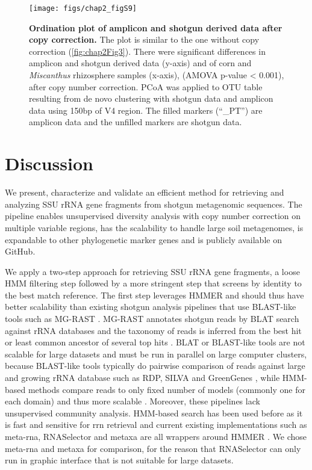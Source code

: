 \documentclass[]{msu-thesis}
\begin{document}
\begin{figure}[tbph!]
  \centering
  \texttt{[image: figs/chap2\_figS9]}
  \caption[Ordination plot of amplicon and shotgun derived data after copy correction]{\textbf{Ordination plot of amplicon and shotgun derived data after copy correction.} The plot is similar to the one without copy correction (\cref{fig:chap2Fig3}). There were significant differences in amplicon and shotgun derived data (y-axis) and of corn and \textit{Miscanthus} rhizosphere samples (x-axis), (AMOVA p-value < 0.001), after copy number correction. PCoA was applied to OTU table resulting from de novo clustering with shotgun data and amplicon data using 150bp of V4 region. The filled markers (``\_PT'') are amplicon data and the unfilled markers are shotgun data.}
  \label{fig:chap2FigS9}
\end{figure}


\section{Discussion}

We present, characterize and validate an efficient method for retrieving and analyzing SSU rRNA gene fragments from shotgun metagenomic sequences. The pipeline enables unsupervised diversity analysis with copy number correction on multiple variable regions, has the scalability to handle large soil metagenomes, is expandable to other phylogenetic marker genes and is publicly available on GitHub.

We apply a two-step approach for retrieving SSU rRNA gene fragments, a loose HMM filtering step followed by a more stringent step that screens by identity to the best match reference. The first step leverages HMMER \cite{eddy_new_2009} and should thus have better scalability than existing shotgun analysis pipelines that use BLAST-like tools such as MG-RAST \cite{sunagawa_metagenomic_2013}. MG-RAST annotates shotgun reads by BLAT search against rRNA databases and the taxonomy of reads is inferred from the best hit or least common ancestor of several top hits \cite{meyer_metagenomics_2008,altschul_gapped_1997,kent_blatblast-like_2002}. BLAT or BLAST-like tools are not scalable for large datasets and must be run in parallel on large computer clusters, because BLAST-like tools typically do pairwise comparison of reads against large and growing rRNA database such as RDP, SILVA and GreenGenes \cite{cole_ribosomal_2014,quast_silva_2013,desantis_greengenes_2006}, while HMM-based methods compare reads to only fixed number of models (commonly one for each domain) and thus more scalable \cite{sunagawa_metagenomic_2013}. Moreover, these pipelines lack unsupervised community analysis. HMM-based search has been used before as it is fast and sensitive for rrn retrieval \cite{huang_identification_2009,           lee_rrnaselector:_2011,bengtsson_metaxa:_2011,shah_comparing_2011} and current existing implementations such as meta-rna, RNASelector and metaxa are all wrappers around HMMER \cite{eddy_new_2009}. We chose meta-rna and metaxa for comparison, for the reason that RNASelector can only run in graphic interface that is not suitable for large datasets.
\end{document}
